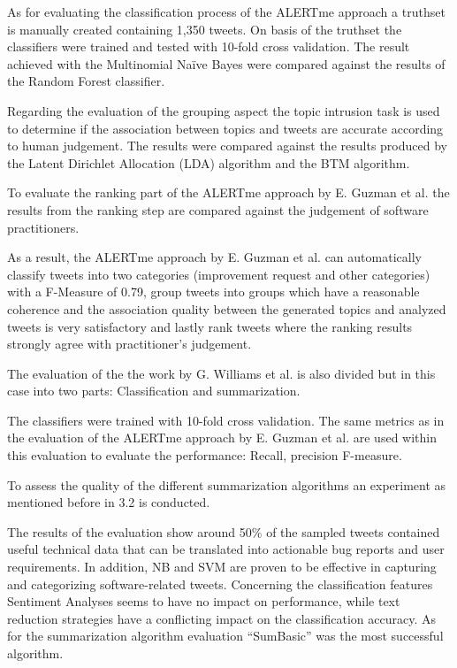 \documentclass[a4paper,10pt, bibliography=totocnumbered]{scrreprt}
\begin{document}
As for evaluating the classification process of the ALERTme approach a truthset is manually created containing 1,350 tweets. 
On basis of the truthset the classifiers were trained and tested with 10-fold cross validation. The result achieved with the Multinomial Naïve Bayes were compared against the results of the Random Forest classifier.


Regarding the evaluation of the grouping aspect the topic intrusion task is used to determine if the association between topics and tweets are accurate according to human judgement. The results were compared against the results produced by the Latent Dirichlet Allocation (LDA) algorithm and the BTM algorithm.


To evaluate the ranking part of the ALERTme approach by E. Guzman et al. \cite{Guzman} the results from the ranking step are compared against the judgement of software practitioners. 

As a result, the ALERTme approach by E. Guzman et al. \cite{Guzman} can automatically classify tweets into two categories (improvement request and other categories) with a F-Measure of 0.79, group tweets into groups which have a reasonable coherence and the association quality between the generated topics and analyzed tweets is very satisfactory and lastly rank tweets where the ranking results strongly agree with practitioner’s judgement.


The evaluation of the the work by G. Williams et al. \cite{Williams} is also divided but in this case into two parts: Classification and summarization.

The classifiers were trained with 10-fold cross validation. The same metrics as in the evaluation of the ALERTme approach by E. Guzman et al. \cite{Guzman} are used within this evaluation to evaluate the performance: Recall, precision F-measure.

To assess the quality of the different summarization algorithms an experiment as mentioned before in 3.2 is conducted.

The results of the evaluation show around 50\% of the sampled tweets contained useful technical data that can be translated into actionable bug reports and user requirements. In addition, NB and SVM are proven to be effective in capturing and categorizing software-related tweets. Concerning the classification features Sentiment Analyses seems to have no impact on performance, while text reduction strategies have a conflicting impact on the classification accuracy. As for the summarization algorithm evaluation “SumBasic” was the most successful algorithm.
\end{document}
